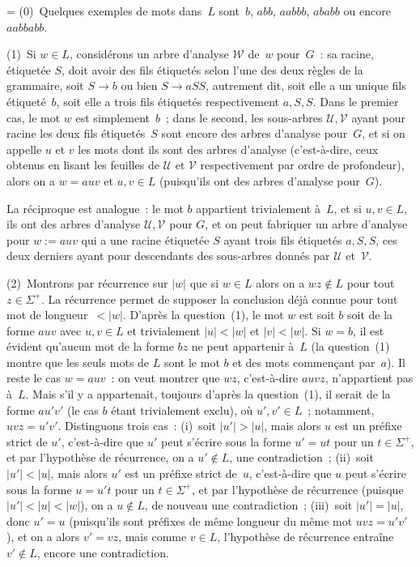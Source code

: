 \documentclass[12pt,a4paper]{article}
\theoremstyle{definition}
\newif\ifcorrige
\newenvironment{corrige}%
{\ifcorrige\relax\else\setbox0=\vbox\bgroup\fi%
\smallbreak\footnotesize\noindent{\underbar{\textit{Corrigé.}}\quad}}
{{\hbox{}\nobreak\hfill\checkmark}%
\ifcorrige\relax\else\egroup\fi\par}
\begin{document}
\begin{corrige}
(0) Quelques exemples de mots dans $L$ sont $b$, $abb$, $aabbb$,
  $ababb$ ou encore $aabbabb$.

(1) Si $w \in L$, considérons un arbre d'analyse $\mathscr{W}$ de $w$
  pour $G$ : sa racine, étiquetée $S$, doit avoir des fils étiquetés
  selon l'une des deux règles de la grammaire, soit $S\rightarrow b$
  ou bien $S\rightarrow aSS$, autrement dit, soit elle a un unique
  fils étiqueté $b$, soit elle a trois fils étiquetés respectivement
  $a,S,S$.  Dans le premier cas, le mot $w$ est simplement $b$ ; dans
  le second, les sous-arbres $\mathscr{U}, \mathscr{V}$ ayant pour
  racine les deux fils étiquetés $S$ sont encore des arbres d'analyse
  pour $G$, et si on appelle $u$ et $v$ les mots dont ils sont des
  arbres d'analyse (c'est-à-dire, ceux obtenus en lisant les feuilles
  de $\mathscr{U}$ et $\mathscr{V}$ respectivement par ordre de
  profondeur), alors on a $w = auv$ et $u,v\in L$ (puisqu'ils ont des
  arbres d'analyse pour $G$).

La réciproque est analogue : le mot $b$ appartient trivialement à $L$,
et si $u,v\in L$, ils ont des arbres d'analyse $\mathscr{U},
\mathscr{V}$ pour $G$, et on peut fabriquer un arbre d'analyse pour $w
:= auv$ qui a une racine étiquetée $S$ ayant trois fils étiquetés
$a,S,S$, ces deux derniers ayant pour descendants des sous-arbres
donnés par $\mathscr{U}$ et $\mathscr{V}$.

\smallbreak

(2) Montrons par récurrence sur $|w|$ que si $w \in L$ alors on a $wz
\not\in L$ pour tout $z \in \Sigma^+$.  La récurrence permet de
supposer la conclusion déjà connue pour tout mot de longueur $<|w|$.
D'après la question (1), le mot $w$ est soit $b$ soit de la forme
$auv$ avec $u,v\in L$ et trivialement $|u|<|w|$ et $|v|<|w|$.  Si
$w=b$, il est évident qu'aucun mot de la forme $bz$ ne peut appartenir
à $L$ (la question (1) montre que les seuls mots de $L$ sont le mot
$b$ et des mots commençant par $a$).  Il reste le cas $w = auv$ : on
veut montrer que $wz$, c'est-à-dire $auvz$, n'appartient pas à $L$.
Mais s'il y a appartenait, toujours d'après la question (1), il serait
de la forme $au'v'$ (le cas $b$ étant trivialement exclu), où $u',v'
\in L$ ; notamment, $uvz = u'v'$.  Distinguons trois cas : (i) soit
$|u'|>|u|$, mais alors $u$ est un préfixe strict de $u'$, c'est-à-dire
que $u'$ peut s'écrire sous la forme $u' = ut$ pour un $t\in
\Sigma^+$, et par l'hypothèse de récurrence, on a $u'\not\in L$, une
contradiction ; (ii) soit $|u'|<|u|$, mais alors $u'$ est un préfixe
strict de $u$, c'est-à-dire que $u$ peut s'écrire sous la forme $u =
u't$ pour un $t\in\Sigma^+$, et par l'hypothèse de récurrence (puisque
$|u'|<|u|<|w|$), on a $u\not\in L$, de nouveau une contradiction ;
(iii) soit $|u'|=|u|$, donc $u'=u$ (puisqu'ils sont préfixes de même
longueur du même mot $uvz = u'v'$), et on a alors $v' = vz$, mais
comme $v\in L$, l'hypothèse de récurrence entraîne $v'\not\in L$,
encore une contradiction.


\end{corrige}
\end{document}
